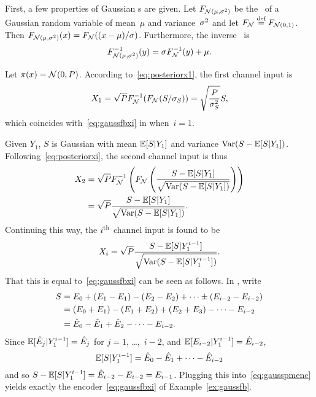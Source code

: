 \begin{example}
  \label{ex:gaussfbpost}
  First, a few properties of Gaussian \cdf s are given. Let $F_{{\mathcal{N}}(\mu, {\sigma^2})}$
  be the \cdf\ of a Gaussian random variable of mean~$\mu$ and variance~${\sigma^2}$
  and let $F_{\mathcal{N}} \stackrel{\text{def}}{=} F_{{\mathcal{N}}(0,1)}$. Then $F_{{\mathcal{N}}(\mu,{\sigma^2})}(x) =
  F_{\mathcal{N}}((x-\mu)/\sigma)$. Furthermore, the inverse \cdf\ is 
  \begin{equation*}
    F_{{\mathcal{N}}(\mu,{\sigma^2})}^{-1}(y) = \sigma F_{\mathcal{N}}^{-1}(y) + \mu.
  \end{equation*}

  Let $\pi(x) = {\mathcal{N}}(0,P)$. According to~\eqref{eq:posteriorx1}, the first channel
  input is
  \begin{equation*}
    X_1 = \sqrt{P} F_{{\mathcal{N}}}^{-1}(F_{{\mathcal{N}}}(S/\sigma_S)) = \sqrt{\frac{P}{{\sigma_S^2}}} S,
  \end{equation*}
  which coincides with~\eqref{eq:gaussfbxi} in  when~$i=1$.

  Given $Y_1$, $S$ is Gaussian with mean $\mathbb{E}[S|Y_1]$ and variance $\operatorname{Var}(S -
  \mathbb{E}[S|Y_1])$. Following~\eqref{eq:posteriorxi}, the second channel input is
  thus
  \begin{align*}
    X_2 &= \sqrt P F_{{\mathcal{N}}}^{-1} \left( F_{{\mathcal{N}}} \left( \frac{S - \mathbb{E}[S|Y_1]}
    {\sqrt{\operatorname{Var}(S-\mathbb{E}[S|Y_1])}} \right) \right) \\
    &= \sqrt{P} \frac{S - \mathbb{E}[S|Y_1]}{\sqrt{\operatorname{Var}(S-\mathbb{E}[S|Y_1])}}.
  \end{align*}
  Continuing this way, the $i{^{\text{th}}}$ channel input is found to be
  \begin{equation}
    \label{eq:gausspmenc}
    X_i = \sqrt{P} \frac{S - \mathbb{E}[S|Y_1^{i-1}]}{\sqrt{\operatorname{Var}(S-\mathbb{E}[S|Y_1^{i-1}])}}.
  \end{equation}
  That this is equal to~\eqref{eq:gaussfbxi} can be seen as follows. In
  , write
  \begin{align*}
    S &= E_0 + (E_1 - E_1) - (E_2 - E_2) + \dots \pm (E_{i-2} -
    E_{i-2}) \\
    &= (E_0 + E_1) - (E_1 + E_2) + (E_2 + E_3) - \dots - E_{i-2} \\
    &= \hat{E}_0 - \hat{E}_1 + \hat{E}_2 - \dots - E_{i-2}.
  \end{align*}
  Since $\mathbb{E}[\hat{E}_j | Y_1^{i-1}] = \hat{E}_j$ for $j = 1$, \dots,~$i-2$, and
  $\mathbb{E}[E_{i-2}|Y_1^{i-1}] = \hat{E}_{i-2}$, 
  \begin{equation*}
    \mathbb{E}[S|Y_1^{i-1}] = \hat{E}_0 - \hat{E}_1 + \dots  - \hat{E}_{i-2}
  \end{equation*}
  and so $S - \mathbb{E}[S|Y_1^{i-1}] = \hat{E}_{i-2} - E_{i-2} = E_{i-1}$. Plugging this
  into~\eqref{eq:gausspmenc} yields exactly the encoder~\eqref{eq:gaussfbxi} of
  Example~\ref{ex:gaussfb}.
\end{example}

